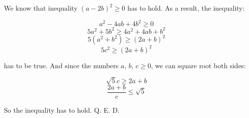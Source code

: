 \documentclass{fkssolpub}
\author{Ondřej Sedláček}
\begin{document}
We know that inequality $(a - 2b)^2 \geq 0$ has to hold. As a result, the inequality:

\[
	a^2 - 4ab + 4b^2 \geq 0
\]
\[
	5a^2 + 5b^2 \geq 4a^2 + 4ab + b^2
\]
\[
	5 (a^2 +b^2) \geq (2a + b)^2
\]
\[
	5 c^2 \geq (2a + b)^2
\]

has to be true. And since the numbers $a$, $b$, $c \geq 0$, we can square root
both sides:

\[
	\sqrt{5} c \geq 2a + b
\]
\[
	\frac{2a + b}{c} \leq \sqrt{5}
\]

So the inequality has to hold. Q. E. D.
\end{document}
